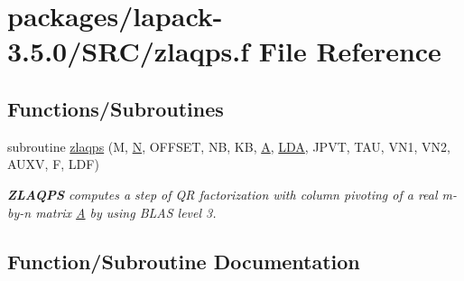 \hypertarget{zlaqps_8f}{}\section{packages/lapack-\/3.5.0/\+S\+R\+C/zlaqps.f File Reference}
\label{zlaqps_8f}
\subsection*{Functions/\+Subroutines}
\begin{DoxyCompactItemize}
\item 
subroutine \hyperlink{zlaqps_8f_ad03c17656823b014be71ed2e7b94d869}{zlaqps} (M, \hyperlink{polmisc_8c_a0240ac851181b84ac374872dc5434ee4}{N}, O\+F\+F\+S\+E\+T, N\+B, K\+B, \hyperlink{classA}{A}, \hyperlink{example__user_8c_ae946da542ce0db94dced19b2ecefd1aa}{L\+D\+A}, J\+P\+V\+T, T\+A\+U, V\+N1, V\+N2, A\+U\+X\+V, F, L\+D\+F)
\begin{DoxyCompactList}\small\item\em {\bfseries Z\+L\+A\+Q\+P\+S} computes a step of Q\+R factorization with column pivoting of a real m-\/by-\/n matrix \hyperlink{classA}{A} by using B\+L\+A\+S level 3. \end{DoxyCompactList}\end{DoxyCompactItemize}


\subsection{Function/\+Subroutine Documentation}
\hypertarget{zlaqps_8f_ad03c17656823b014be71ed2e7b94d869}{}

